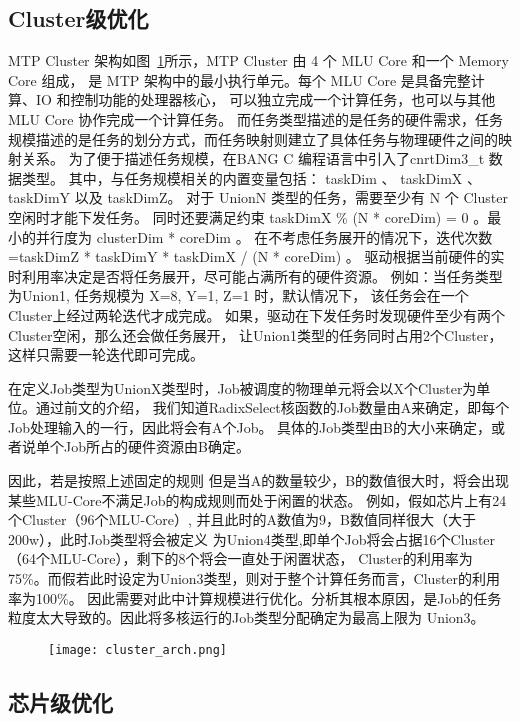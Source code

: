 \subsection{Cluster级优化}
MTP Cluster 架构如图~\ref{fig:cluster_arch}所示，MTP Cluster 由 4 个 MLU Core 和一个 Memory Core 组成，
是 MTP 架构中的最小执行单元。每个 MLU Core 是具备完整计算、IO 和控制功能的处理器核心，
可以独立完成一个计算任务，也可以与其他 MLU Core 协作完成一个计算任务。
而任务类型描述的是任务的硬件需求，任务规模描述的是任务的划分方式，而任务映射则建立了具体任务与物理硬件之间的映射关系。
为了便于描述任务规模，在BANG C 编程语言中引入了cnrtDim3\_t 数据类型。
其中，与任务规模相关的内置变量包括： taskDim 、 taskDimX 、 taskDimY 以及 taskDimZ。
对于 UnionN 类型的任务，需要至少有 N 个 Cluster 空闲时才能下发任务。
同时还要满足约束 taskDimX \% (N * coreDim) = 0 。最小的并行度为 clusterDim * coreDim 。
在不考虑任务展开的情况下，迭代次数=taskDimZ * taskDimY * taskDimX / (N * coreDim) 。
驱动根据当前硬件的实时利用率决定是否将任务展开，尽可能占满所有的硬件资源。
例如：当任务类型为Union1, 任务规模为 {X=8, Y=1, Z=1} 时，默认情况下，
该任务会在一个Cluster上经过两轮迭代才成完成。
如果，驱动在下发任务时发现硬件至少有两个Cluster空闲，那么还会做任务展开，
让Union1类型的任务同时占用2个Cluster，这样只需要一轮迭代即可完成。

在定义Job类型为UnionX类型时，Job被调度的物理单元将会以X个Cluster为单位。通过前文的介绍，
我们知道RadixSelect核函数的Job数量由A来确定，即每个Job处理输入的一行，因此将会有A个Job。
具体的Job类型由B的大小来确定，或者说单个Job所占的硬件资源由B确定。

因此，若是按照上述固定的规则
但是当A的数量较少，B的数值很大时，将会出现某些MLU-Core不满足Job的构成规则而处于闲置的状态。
例如，假如芯片上有24个Cluster（96个MLU-Core）, 并且此时的A数值为9，B数值同样很大（大于200w），此时Job类型将会被定义
为Union4类型,即单个Job将会占据16个Cluster（64个MLU-Core），剩下的8个将会一直处于闲置状态，
Cluster的利用率为75\%。而假若此时设定为Union3类型，则对于整个计算任务而言，Cluster的利用率为100\%。
因此需要对此中计算规模进行优化。分析其根本原因，是Job的任务粒度太大导致的。因此将多核运行的Job类型分配确定为最高上限为
Union3。

\begin{figure}[ht]
    \centering
    \texttt{[image: cluster\_arch.png]}
    \caption{}
    \label{fig:cluster_arch}
\end{figure}


\subsection{芯片级优化}

